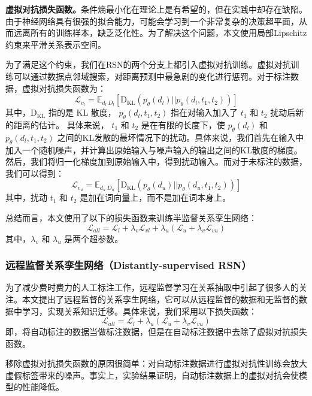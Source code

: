 \begin{translation}
\textbf{虚拟对抗损失函数。}条件熵最小化在理论上是有希望的，但在实践中却存在缺陷。由于神经网络具有很强的拟合能力，可能会学习到一个非常复杂的决策超平面，从而远离所有的训练样本，缺乏泛化性。为了解决这个问题，本文使用局部Lipschitz约束来平滑关系表示空间。

为了满足这个约束，我们在RSN的两个分支上都引入虚拟对抗训练。虚拟对抗训练可以通过数据点邻域搜索，对距离预测中最急剧的变化进行惩罚。对于标注数据，虚拟对抗损失函数为：
\begin{equation}
	\mathcal{L}_{v_l} = \mathbb{E}_{d_l~D_l}[\text{D}_\text{KL}(p_\theta(d_l)||p_\theta(d_l, t_1, t_2))]
\end{equation}
其中，$\text{D}_\text{KL}$ 指的是 KL 散度， $p_\theta(d_l, t_1, t_2)$ 指在对输入加入了 $t_1$ 和 $t_2$ 扰动后新的距离的估计。
具体来说， $t_1$ 和 $t_2$ 是在有限的长度下，使 $p_\theta(d_l)$ 和 $p_\theta(d_l, t_1, t_2)$ 之间的KL发散的最坏情况下的扰动。具体来说，我们首先在输入中加入一个随机噪声，并计算出原始输入与噪声输入的输出之间的KL散度的梯度。然后，我们将归一化梯度加到原始输入中，得到扰动输入。而对于未标注的数据，我们可以得到：
\begin{equation}
	\mathcal{L}_{v_u} = \mathbb{E}_{d_u~D_u}[\text{D}_\text{KL}(p_\theta(d_u)||p_\theta(d_u, t_1, t_2))]
\end{equation}
其中，扰动 $t_1$ 和 $t_2$ 是加在词向量上，而不是加在词本身上。

总结而言，本文使用了以下的损失函数来训练半监督关系孪生网络：
\begin{equation}
	\mathcal{L}_{all} = \mathcal{L}_l + \lambda_v\mathcal{L}_{vl} + \lambda_u(\mathcal{L}_u + \lambda_v\mathcal{L}_{vu})
\end{equation}
其中，$\lambda_v$ 和 $\lambda_u$ 是两个超参数。

\subsubsection{远程监督关系孪生网络（Distantly-supervised RSN）}
为了减少费时费力的人工标注工作，远程监督学习在关系抽取中引起了很多人的关注。本文提出了远程监督的关系孪生网络，它可以从远程监督的数据和无监督的数据中学习，实现关系知识迁移。具体来说，我们采用以下损失函数：
\begin{equation}
	\mathcal{L}_{all} = \mathcal{L}_l + \lambda_u(\mathcal{L}_u + \lambda_v\mathcal{L}_{vu})
\end{equation}
即，将自动标注的数据当做标注数据，但是在自动标注数据中去除了虚拟对抗损失函数。

移除虚拟对抗损失函数的原因很简单：对自动标注数据进行虚拟对抗性训练会放大虚假标签带来的噪声。事实上，实验结果证明，自动标注数据上的虚拟对抗会使模型的性能降低。


\end{translation}
